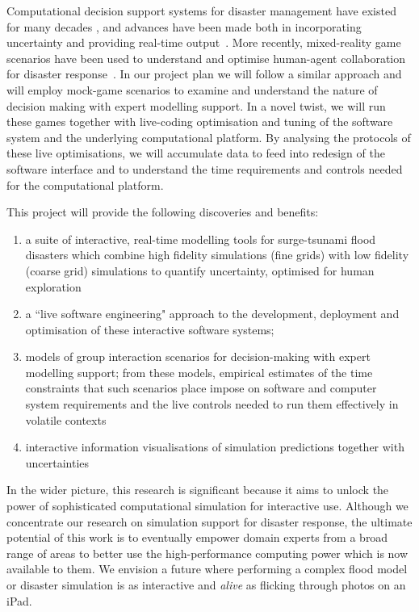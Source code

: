 \documentclass[a4paper,fontsize=13pt]{scrartcl}
\begin{document}
Computational decision support systems for disaster management
have existed for many decades \parencite{wallace_decision_1985}, and
advances have been made both in incorporating
uncertainty \parencite{thompson_social_2014-1,neale_navigating_2015}
and providing real-time output~\parencite{yu_support_2006}. More recently, 
mixed-reality game scenarios have been used to understand and optimise human-agent 
collaboration for disaster response~\parencite{ramchurn2016human}.
In our project plan we will follow a similar approach and will employ mock-game scenarios to examine and understand the nature of decision making with expert modelling support. In a novel twist, we will run these games together with live-coding optimisation and tuning of the software system and the underlying computational platform. By analysing the protocols of these live optimisations, we will accumulate data to feed into redesign of the software interface and to understand the time requirements and controls needed for the computational platform.


This project will provide the following discoveries and benefits:
\begin{enumerate}

\item a suite of interactive, real-time modelling tools for surge-tsunami flood disasters which combine
high fidelity simulations (fine grids) with low fidelity (coarse grid) simulations to quantify
uncertainty, optimised for human exploration


\item a ``live software engineering" approach to the development, deployment 
and optimisation of these interactive software systems; 

\item models of group interaction scenarios for decision-making 
 with expert modelling support; from these models, empirical estimates of  the 
time constraints that such scenarios place impose on software and computer system requirements and the live controls needed to run them effectively in volatile contexts

\item interactive information visualisations of simulation predictions
together with uncertainties
 

\end{enumerate}

In the wider picture, this research is significant because it aims to unlock the power of
sophisticated
computational simulation for interactive use. Although we concentrate
our research on simulation support for disaster response, the
ultimate potential of this work is to eventually empower domain
experts from a broad range of areas to better use the high-performance
computing power which is now available to them. We envision a future
where performing a complex flood model or disaster simulation is as
interactive and \emph{alive} as flicking through photos on an iPad.
\end{document}
